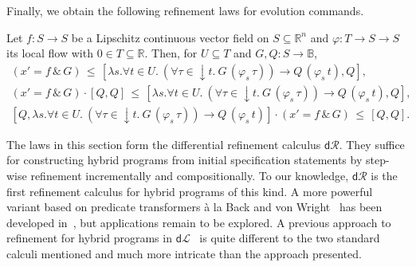 \documentclass[envcountsame,envcountsect]{llncs}
\newcommand{\dL}{\mathsf{d}\mathcal{L}}
\newcommand{\dR}{\mathsf{d}\mathcal{R}}
\newcommand{\flow}{\varphi}
\newcommand{\reals}{\mathbb{R}}
\newcommand{\bools}{\mathbb{B}}
\begin{document}
Finally, we obtain the following refinement laws for evolution
commands.
\begin{lemma}\label{P:r-evl-lemma}
  Let $f:S\to S$ be a Lipschitz continuous vector field on
  $S\subseteq \reals^n$ and $\flow:T\to S\to S$ its local flow with
  $0\in T\subseteq \reals$. Then, for $U\subseteq T$ and
  $G,Q:S\to\bools$,
\begin{gather*}
(x' = f\, \&\, G)\, \le\, [\lambda s.\forall t\in U.\ (\forall
\tau\in {\downarrow}t.\ G\, (\flow_s\, \tau))\to Q\, (\flow_s\, t),Q],\label{eq:r-evl}\tag{r-evl}\\
(x' = f\, \&\, G) \cdot \left[Q,Q\right]\, \le\, [\lambda s. \forall t\in U.\ (\forall
\tau\in {\downarrow}t.\ G\, (\flow_s\, \tau))\to Q\, (\flow_s\, t),Q],\label{eq:r-evll}\tag{r-evll}\\
\left[Q,\lambda s. \forall t\in U.\ (\forall
\tau\in {\downarrow}t.\ G\, (\flow_s\, \tau))\to Q\, (\flow_s\,
t)\right]\cdot (x' = f\, \&\, G) \, \le \, [Q,Q].\label{eq:r-evlr}\tag{r-evlr}
\end{gather*}
\end{lemma}

The laws in this section form the differential refinement calculus
$\dR$.  They suffice for constructing hybrid programs from initial
specification statements by step-wise refinement incrementally and
compositionally. To our knowledge, $\dR$ is the first refinement
calculus for hybrid programs of this kind.  A more powerful variant
based on predicate transformers \`a la Back and von
Wright~\cite{BackW98} has been developed in~\cite{MuniveS19}, but
applications remain to be explored.  A previous approach to refinement
for hybrid programs in $\dL$~\cite{LoosP16} is quite different to the
two standard calculi mentioned and much more intricate than the
approach presented.
\end{document}
